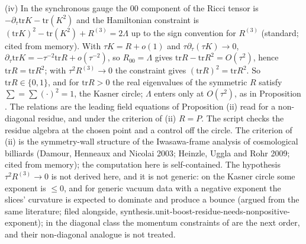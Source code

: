 (iv) In the synchronous gauge the $00$ component of the Ricci tensor is $-\partial_{\tau}\mathrm{tr}K - \mathrm{tr}(K^{2})$ and the Hamiltonian constraint is $(\mathrm{tr}K)^{2} - \mathrm{tr}(K^{2}) + R^{(3)} = 2\Lambda$ up to the sign convention for $R^{(3)}$ (standard; cited from memory). With $\tau K = R + o(1)$ and $\tau\partial_{\tau}(\tau K) \to 0$, $\partial_{\tau}\mathrm{tr}K = -\tau^{-2}\mathrm{tr}R + o(\tau^{-2})$, so $R_{00} = \Lambda$ gives $\mathrm{tr}R - \mathrm{tr}R^{2} = O(\tau^{2})$, hence $\mathrm{tr}R = \mathrm{tr}R^{2}$; with $\tau^{2}R^{(3)} \to 0$ the constraint gives $(\mathrm{tr}R)^{2} = \mathrm{tr}R^{2}$. So $\mathrm{tr}R \in \{0, 1\}$, and for $\mathrm{tr}R > 0$ the real eigenvalues of the symmetric $R$ satisfy $\sum = \sum(\cdot)^{2} = 1$, the Kasner circle; $\Lambda$ enters only at $O(\tau^{2})$, as in Proposition . The relations are the leading field equations of Proposition (ii) read for a non-diagonal residue, and under the criterion of (ii) $R = P$. The script checks the residue algebra at the chosen point and a control off the circle. The criterion of (ii) is the symmetry-wall structure of the Iwasawa-frame analysis of cosmological billiards (Damour, Henneaux and Nicolai 2003; Heinzle, Uggla and Rohr 2009; cited from memory); the computation here is self-contained. The hypothesis $\tau^{2}R^{(3)} \to 0$ is not derived here, and it is not generic: on the Kasner circle some exponent is $\leq 0$, and for generic vacuum data with a negative exponent the slices' curvature is expected to dominate and produce a bounce (argued from the same literature; filed alongside, synthesis.unit-boost-residue-needs-nonpositive-exponent); in the diagonal class the momentum constraints of  are the next order, and their non-diagonal analogue is not treated.
